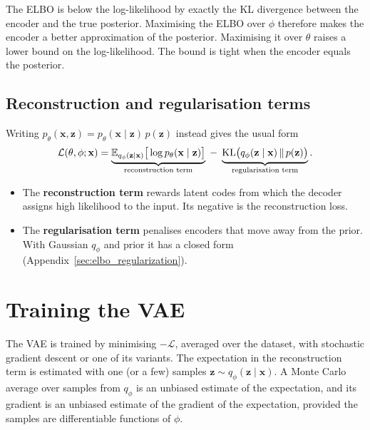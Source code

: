 \begin{inwords}
The ELBO is below the log-likelihood by exactly the KL divergence
between the encoder and the true posterior. Maximising the ELBO over
$\phi$ therefore makes the encoder a better approximation of the
posterior. Maximising it over $\theta$ raises a lower bound on the
log-likelihood. The bound is tight when the encoder equals the
posterior.
\end{inwords}

\subsection{Reconstruction and regularisation terms}

Writing $p_\theta(\mathbf{x}, \mathbf{z}) =
p_\theta(\mathbf{x} \mid \mathbf{z})\,p(\mathbf{z})$ instead gives the
usual form
\begin{equation*}
    \mathcal{L}(\theta, \phi; \mathbf{x}) =
    \underbrace{\mathbb{E}_{q_{\phi}(\mathbf{z} \mid \mathbf{x})}
    \big[\log p_{\theta}(\mathbf{x} \mid \mathbf{z})\big]}_{
    \text{reconstruction term}}
    \;-\;
    \underbrace{\mathrm{KL}\big(q_{\phi}(\mathbf{z} \mid \mathbf{x}) \,\|\,
    p(\mathbf{z})\big)}_{\text{regularisation term}}.
\end{equation*}
\begin{itemize}
    \item The \textbf{reconstruction term} rewards latent codes from
    which the decoder assigns high likelihood to the input. Its negative
    is the reconstruction loss.
    \item The \textbf{regularisation term} penalises encoders that move
    away from the prior. With Gaussian $q_\phi$ and prior it has a closed
    form (Appendix~\ref{sec:elbo_regularization}).
\end{itemize}

\section{Training the VAE}

The VAE is trained by minimising $-\mathcal{L}$, averaged over the
dataset, with stochastic gradient descent or one of its variants. The
expectation in the reconstruction term is estimated with one (or a few)
samples $\mathbf{z} \sim q_\phi(\mathbf{z} \mid \mathbf{x})$. A Monte
Carlo average over samples from $q_\phi$ is an unbiased estimate of the
expectation, and its gradient is an unbiased estimate of the gradient of
the expectation, provided the samples are differentiable functions of
$\phi$.

